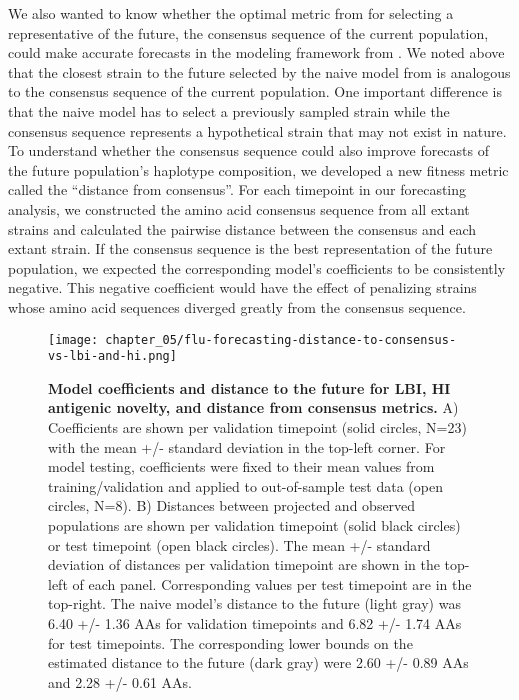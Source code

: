We also wanted to know whether the optimal metric from \citet{Barrat-Charlaix2020} for selecting a representative of the future, the consensus sequence of the current population, could make accurate forecasts in the modeling framework from \citet{Huddleston2020}.
We noted above that the closest strain to the future selected by the naive model from \citet{Huddleston2020} is analogous to the consensus sequence of the current population.
One important difference is that the naive model has to select a previously sampled strain while the consensus sequence represents a hypothetical strain that may not exist in nature.
To understand whether the consensus sequence could also improve forecasts of the future population's haplotype composition, we developed a new fitness metric called the ``distance from consensus''.
For each timepoint in our forecasting analysis, we constructed the amino acid consensus sequence from all extant strains and calculated the pairwise distance between the consensus and each extant strain.
If the consensus sequence is the best representation of the future population, we expected the corresponding model's coefficients to be consistently negative.
This negative coefficient would have the effect of penalizing strains whose amino acid sequences diverged greatly from the consensus sequence.

\begin{figure}
  \centering
  \texttt{[image: chapter\_05/flu-forecasting-distance-to-consensus-vs-lbi-and-hi.png]}
  \caption[{Model coefficients and distance to the future for LBI, HI antigenic novelty, and distance from consensus metrics.}]{{\bf Model coefficients and distance to the future for LBI, HI antigenic novelty, and distance from consensus metrics.}
    A) Coefficients are shown per validation timepoint (solid circles, N=23) with the mean +/- standard deviation in the top-left corner.
    For model testing, coefficients were fixed to their mean values from training/validation and applied to out-of-sample test data (open circles, N=8).
    B) Distances between projected and observed populations are shown per validation timepoint (solid black circles) or test timepoint (open black circles).
    The mean +/- standard deviation of distances per validation timepoint are shown in the top-left of each panel.
    Corresponding values per test timepoint are in the top-right.
    The naive model's distance to the future (light gray) was 6.40 +/- 1.36 AAs for validation timepoints and 6.82 +/- 1.74 AAs for test timepoints.
    The corresponding lower bounds on the estimated distance to the future (dark gray) were 2.60 +/- 0.89 AAs and 2.28 +/- 0.61 AAs.\label{fig:distance-to-consensus-performance} }
\end{figure}

